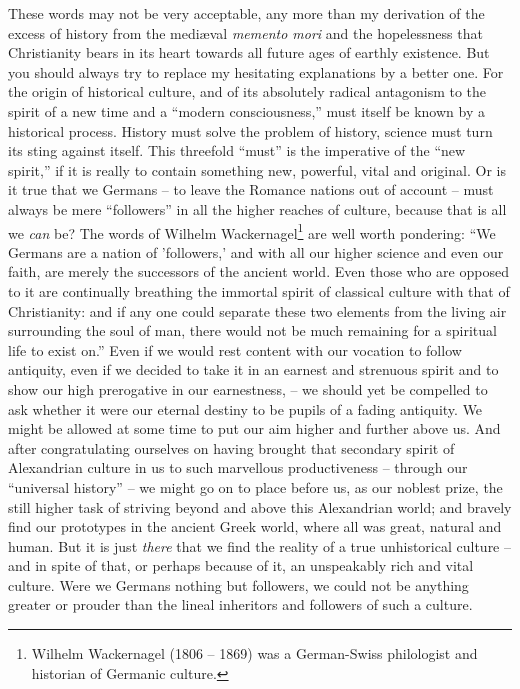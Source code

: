 These words may not be very acceptable, any more than my derivation
of the excess of history from the mediæval \textit{memento mori} and the
hopelessness that Christianity bears in its heart towards all future
ages of earthly existence. But you should always try to replace my
hesitating explanations by a better one. For the origin of historical
culture, and of its absolutely radical antagonism to the spirit of a
new time and a \enquote{modern consciousness,} must itself be known by a
historical process. History must solve the problem of history,
science must turn its sting against itself. This threefold \enquote{must} is
the imperative of the \enquote{new spirit,} if it is really to contain
something new, powerful, vital and original. Or is it true that we
Germans -- to leave the Romance nations out of account -- must always be
mere \enquote{followers} in all the higher reaches of culture, because that
is all we \textit{can} be? The words of Wilhelm Wackernagel\footnote{Wilhelm Wackernagel (1806 -- 1869) was a German-Swiss philologist and historian of Germanic culture.} are well worth
pondering: \enquote{We Germans are a nation of 'followers,' and with all our
higher science and even our faith, are merely the successors of the
ancient world. Even those who are opposed to it are continually
breathing the immortal spirit of classical culture with that of
Christianity: and if any one could separate these two elements from
the living air surrounding the soul of man, there would not be much
remaining for a spiritual life to exist on.} Even if we would rest
content with our vocation to follow antiquity, even if we decided to
take it in an earnest and strenuous spirit and to show our high
prerogative in our earnestness, -- we should yet be compelled to ask
whether it were our eternal destiny to be pupils of a fading
antiquity. We might be allowed at some time to put our aim higher and
further above us. And after congratulating ourselves on having
brought that secondary spirit of Alexandrian culture in us to such
marvellous productiveness -- through our \enquote{universal history} -- we might
go on to place before us, as our noblest prize, the still higher task
of striving beyond and above this Alexandrian world; and bravely find
our prototypes in the ancient Greek world, where all was great,
natural and human. But it is just \textit{there} that we find the reality of
a true unhistorical culture -- and in spite of that, or perhaps because
of it, an unspeakably rich and vital culture. Were we Germans nothing
but followers, we could not be anything greater or prouder than the
lineal inheritors and followers of such a culture.

